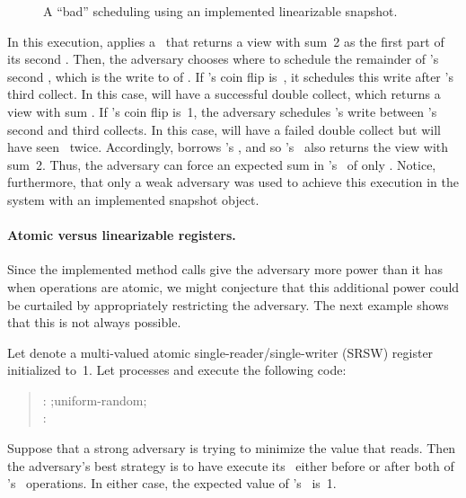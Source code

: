 \documentclass[11pt,letterpaper]{article}
\begin{document}
\begin{figure*}[htbp]
\begin{center}
\end{center}
\vspace{-1em}
\caption{A ``bad'' scheduling using an implemented linearizable snapshot.}
\label{fig:snapshot}
\end{figure*}

In this execution,  applies a \Scan\ that returns a view  with sum~2 as the first part of its second \Update.
Then, the adversary chooses where to schedule the remainder of 's second \Update,
which is the write to  of .
If 's coin flip is~, it schedules this write after 's third collect.
In this case,  will have a successful double collect, which returns a view with sum .
If 's coin flip is~1, the adversary schedules 's write between 's second and third collects.
In this case,  will have a failed double collect but will have seen  \Update\ twice.
Accordingly,  borrows 's \Scan, and so 's \Scan\ also returns the view  with sum~2.
Thus, the adversary can force an expected sum in 's \Scan\ of only .
Notice, furthermore, that only a weak adversary was used to achieve this execution in the system with an implemented
snapshot object.

\paragraph{Atomic versus linearizable registers.}
Since the implemented method calls give the adversary more power than it has when operations are atomic,
we might conjecture that this additional power could be curtailed by appropriately restricting the adversary.
The next example shows that this is not always possible.

Let  denote a multi-valued atomic single-reader/single-writer (SRSW) register initialized to~1.
Let processes  and  execute the following code:

\begin{quote}
\medskip
\noindent
: ;\quad  uniform-random;\quad     \\
:  
\medskip
\end{quote}

Suppose that a strong adversary is trying to minimize the value that  reads.
Then the adversary's best strategy is to have  execute its \Read\ either before or after both of 's \Write\ operations.
In either case, the expected value of 's \Read\ is~1.
\end{document}
